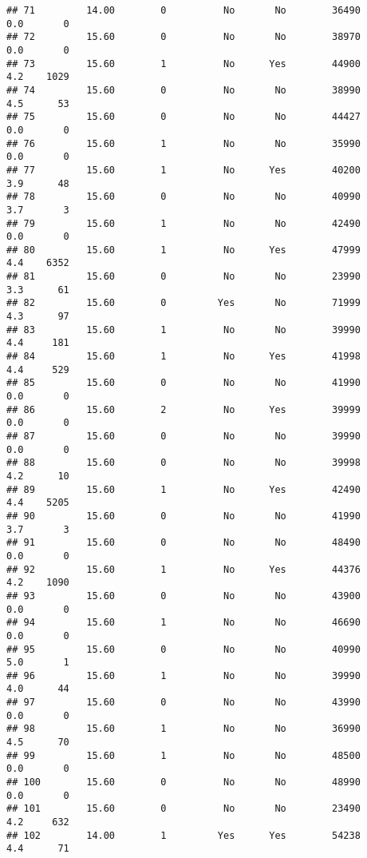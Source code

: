 \documentclass[
]{article}
\begin{document}
\begin{verbatim}
## 71         14.00        0          No       No        36490         0.0       0
## 72         15.60        0          No       No        38970         0.0       0
## 73         15.60        1          No      Yes        44900         4.2    1029
## 74         15.60        0          No       No        38990         4.5      53
## 75         15.60        0          No       No        44427         0.0       0
## 76         15.60        1          No       No        35990         0.0       0
## 77         15.60        1          No      Yes        40200         3.9      48
## 78         15.60        0          No       No        40990         3.7       3
## 79         15.60        1          No       No        42490         0.0       0
## 80         15.60        1          No      Yes        47999         4.4    6352
## 81         15.60        0          No       No        23990         3.3      61
## 82         15.60        0         Yes       No        71999         4.3      97
## 83         15.60        1          No       No        39990         4.4     181
## 84         15.60        1          No      Yes        41998         4.4     529
## 85         15.60        0          No       No        41990         0.0       0
## 86         15.60        2          No      Yes        39999         0.0       0
## 87         15.60        0          No       No        39990         0.0       0
## 88         15.60        0          No       No        39998         4.2      10
## 89         15.60        1          No      Yes        42490         4.4    5205
## 90         15.60        0          No       No        41990         3.7       3
## 91         15.60        0          No       No        48490         0.0       0
## 92         15.60        1          No      Yes        44376         4.2    1090
## 93         15.60        0          No       No        43900         0.0       0
## 94         15.60        1          No       No        46690         0.0       0
## 95         15.60        0          No       No        40990         5.0       1
## 96         15.60        1          No       No        39990         4.0      44
## 97         15.60        0          No       No        43990         0.0       0
## 98         15.60        1          No       No        36990         4.5      70
## 99         15.60        1          No       No        48500         0.0       0
## 100        15.60        0          No       No        48990         0.0       0
## 101        15.60        0          No       No        23490         4.2     632
## 102        14.00        1         Yes      Yes        54238         4.4      71

\end{verbatim}
\end{document}
